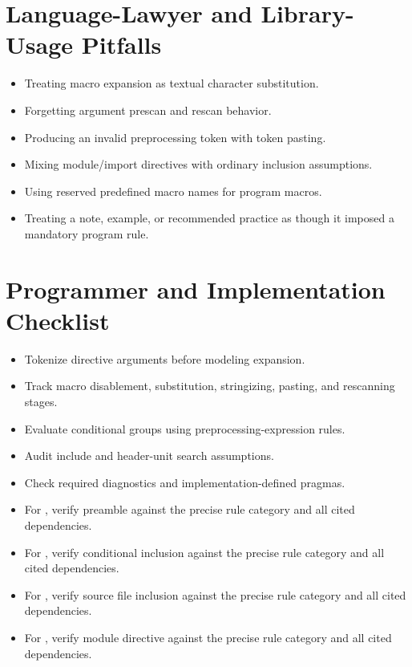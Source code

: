 \documentclass[11pt,letterpaper]{article}
\begin{document}
\section{Language-Lawyer and Library-Usage Pitfalls}
\begin{CornellReferencePitfallBox}\begin{itemize}[label=\textcolor{CornellReferenceAmber}{$\blacktriangleright$}]
\item Treating macro expansion as textual character substitution.
\item Forgetting argument prescan and rescan behavior.
\item Producing an invalid preprocessing token with token pasting.
\item Mixing module/import directives with ordinary inclusion assumptions.
\item Using reserved predefined macro names for program macros.
\item Treating a note, example, or recommended practice as though it imposed a mandatory program rule.
\end{itemize}\end{CornellReferencePitfallBox}
\section{Programmer and Implementation Checklist}
\begin{CornellReferenceChecklistBox}\begin{itemize}[label=$\square$]
\item Tokenize directive arguments before modeling expansion.
\item Track macro disablement, substitution, stringizing, pasting, and rescanning stages.
\item Evaluate conditional groups using preprocessing-expression rules.
\item Audit include and header-unit search assumptions.
\item Check required diagnostics and implementation-defined pragmas.
\item For , verify preamble against the precise rule category and all cited dependencies.
\item For , verify conditional inclusion against the precise rule category and all cited dependencies.
\item For , verify source file inclusion against the precise rule category and all cited dependencies.
\item For , verify module directive against the precise rule category and all cited dependencies.
\end{itemize}\end{CornellReferenceChecklistBox}
\end{document}
